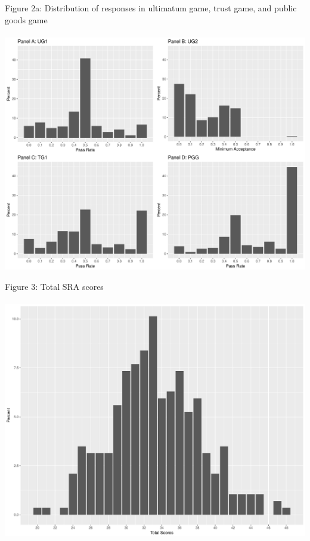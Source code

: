 \documentclass[12pt]{article}
\begin{document}
Figure 2a: Distribution of responses in ultimatum game, trust game, and public goods game \\ \\
\includegraphics[scale=0.5]{Figure2a.pdf}

Figure 3: Total SRA scores\\ \\
\includegraphics[scale=0.35]{SRAimg}\\
\end{document}
